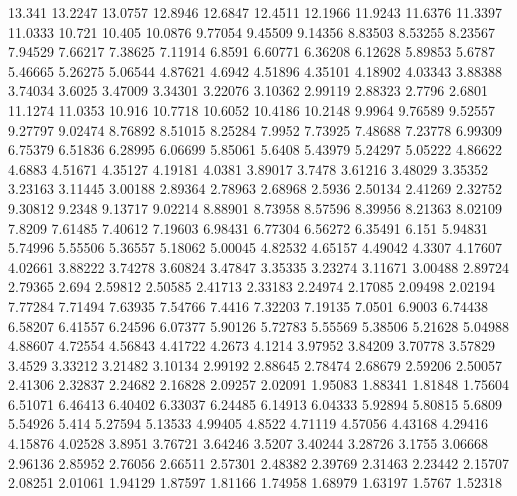 13.341      13.2247      13.0757      12.8946      12.6847      12.4511      12.1966      11.9243      11.6376      11.3397      11.0333      10.721      10.405      10.0876      9.77054      9.45509      9.14356      8.83503      8.53255      8.23567      7.94529      7.66217      7.38625      7.11914      6.8591      6.60771      6.36208      6.12628      5.89853      5.6787      5.46665      5.26275      5.06544      4.87621      4.6942      4.51896      4.35101      4.18902      4.03343      3.88388      3.74034      3.6025      3.47009      3.34301      3.22076      3.10362      2.99119      2.88323      2.7796      2.6801      
11.1274      11.0353      10.916      10.7718      10.6052      10.4186      10.2148      9.9964      9.76589      9.52557      9.27797      9.02474      8.76892      8.51015      8.25284      7.9952      7.73925      7.48688      7.23778      6.99309      6.75379      6.51836      6.28995      6.06699      5.85061      5.6408      5.43979      5.24297      5.05222      4.86622      4.6883      4.51671      4.35127      4.19181      4.0381      3.89017      3.7478      3.61216      3.48029      3.35352      3.23163      3.11445      3.00188      2.89364      2.78963      2.68968      2.5936      2.50134      2.41269      2.32752      
9.30812      9.2348      9.13717      9.02214      8.88901      8.73958      8.57596      8.39956      8.21363      8.02109      7.8209      7.61485      7.40612      7.19603      6.98431      6.77304      6.56272      6.35491      6.151      5.94831      5.74996      5.55506      5.36557      5.18062      5.00045      4.82532      4.65157      4.49042      4.3307      4.17607      4.02661      3.88222      3.74278      3.60824      3.47847      3.35335      3.23274      3.11671      3.00488      2.89724      2.79365      2.694      2.59812      2.50585      2.41713      2.33183      2.24974      2.17085      2.09498      2.02194      
7.77284      7.71494      7.63935      7.54766      7.4416      7.32203      7.19135      7.0501      6.9003      6.74438      6.58207      6.41557      6.24596      6.07377      5.90126      5.72783      5.55569      5.38506      5.21628      5.04988      4.88607      4.72554      4.56843      4.41722      4.2673      4.1214      3.97952      3.84209      3.70778      3.57829      3.4529      3.33212      3.21482      3.10134      2.99192      2.88645      2.78474      2.68679      2.59206      2.50057      2.41306      2.32837      2.24682      2.16828      2.09257      2.02091      1.95083      1.88341      1.81848      1.75604      
6.51071      6.46413      6.40402      6.33037      6.24485      6.14913      6.04333      5.92894      5.80815      5.6809      5.54926      5.414      5.27594      5.13533      4.99405      4.8522      4.71119      4.57056      4.43168      4.29416      4.15876      4.02528      3.8951      3.76721      3.64246      3.5207      3.40244      3.28726      3.1755      3.06668      2.96136      2.85952      2.76056      2.66511      2.57301      2.48382      2.39769      2.31463      2.23442      2.15707      2.08251      2.01061      1.94129      1.87597      1.81166      1.74958      1.68979      1.63197      1.5767      1.52318      

